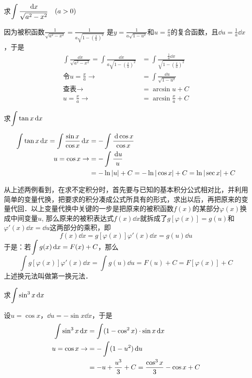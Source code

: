 \begin{example}
    求$\displaystyle\int \dfrac{\,{\rm d} x}{\sqrt{a^2-x^2}}\quad (a>0)$
\end{example}

\begin{solution}
    因为被积函数$\frac{1}{\sqrt{a^2-x^2}}=\frac{1}{a\sqrt{1-\left(\frac{x}{a}\right)^2}}$
是$y=\frac{1}{a\sqrt{1-u^2}}$和$u=\frac{x}{a}$的复合函数，且$\dd u=\frac{1}{a}\dd x$，于是
\[\begin{split}
    \int \frac{\dd x}{\sqrt{a^2-x^2}}=\int \frac{\dd x}{a\sqrt{1-\left(\frac{x}{a}\right)^2}}&=\int \frac{\frac{1}{a}\dd x}{\sqrt{1-\left(\frac{x}{a}\right)^2}}\\
    \text{令}u=\frac{x}{a}\to &= \int \frac{\dd u}{\sqrt{1-u^2}}\\
    \text{查表}\to &=\arcsin u+C\\
    u=\frac{x}{a} \to &=\arcsin \frac{x}{a}+C
\end{split}\]
\end{solution}

\begin{example}
    求$\displaystyle\int \tan x\,{\rm d} x$
\end{example}


\begin{solution}
\[\begin{split}
    \displaystyle\int \tan x\,{\rm d} x=\displaystyle\int  \dfrac{\sin x}{\cos x}\,{\rm d} x&=-\int \dfrac{\,{\rm d} \cos x}{\cos x}\\
    u=\cos x\to &=-\int \dfrac{\,{\rm d} u}{u}\\
    &=-\ln|u|+C=-\ln |\cos x|+C=\ln |\sec x|+C
\end{split}\]
\end{solution}

从上述两例看到，在求不定积分时，首先要与已知的基本积分公式相对比，并利用简单的变量代换，把要求的积分凑成公式所具有的形式，求出以后，再把原来的变量代回．以上变量代换中关键的一步是把原来的被积函数$f(x)$的某部分$\varphi(x)$换成中间变量$u$, 那么原来的被积表达式$f(x)\dd x$就拆成了$g[\varphi(x)]=g(u)$和$\varphi'(x)\dd x=\dd u$这两部分的乘积，即
\[f (x) \dd x=g [\varphi (x) ] \varphi' (x) \dd x=g (u) \dd u\]
于是：若$\displaystyle\int g(x)\,{\rm d} x=F(x)+C$，那么
\[\int g[\varphi(x)]\varphi'(x)\dd x=\int g(u)\dd u=F(u)+C=F[\varphi(x)]+C\]
上述换元法叫做第一换元法．

\begin{example}
求$\displaystyle\int \sin^{3}x\,{\rm d} x$
\end{example}

\begin{solution}
设$u=\cos x$，$\dd u=-\sin x\dd x$，于是
\[\begin{split}
    \displaystyle\int \sin^{3}x\,{\rm d} x&=\int (1-\cos^2 x)\cdot \sin x\,{\rm d} x\\
  u=\cos x\to  &=-\int (1-u^2)\,{\rm d} u\\
  &=-u+\dfrac{u^3}{3}+C=\dfrac{\cos^3 x}{3}-\cos x+C
\end{split}\]
\end{solution}

